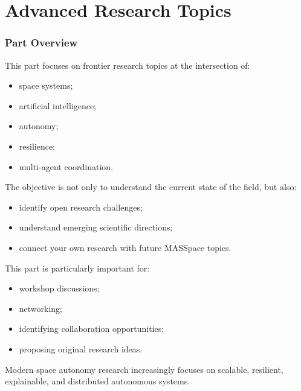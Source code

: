 \documentclass[10pt,a4paper,twocolumn]{article}
\begin{document}

\part{Advanced Research Topics}


\section*{Part Overview}

This part focuses on frontier research topics at the intersection of:
\begin{itemize}
    \item space systems;
    \item artificial intelligence;
    \item autonomy;
    \item resilience;
    \item multi-agent coordination.
\end{itemize}

The objective is not only to understand the current state of the field, but also:
\begin{itemize}
    \item identify open research challenges;
    \item understand emerging scientific directions;
    \item connect your own research with future MASSpace topics.
\end{itemize}

This part is particularly important for:
\begin{itemize}
    \item workshop discussions;
    \item networking;
    \item identifying collaboration opportunities;
    \item proposing original research ideas.
\end{itemize}

\begin{keybox}
    Modern space autonomy research increasingly focuses on scalable, resilient, explainable, and distributed autonomous systems.
\end{keybox}
\end{document}
